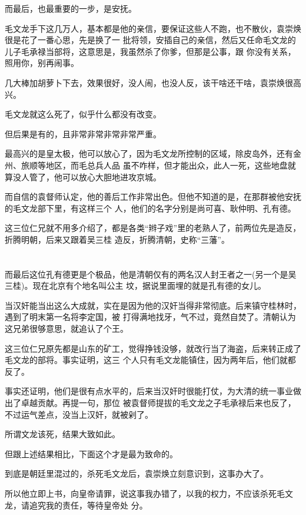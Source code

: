 \documentclass[11pt,a4paper,onecolumn]{article}
\begin{document}
而最后，也最重要的一步，是安抚。

毛文龙手下这几万人，基本都是他的亲信，要保证这些人不跑，也不散伙，袁崇焕很是花了一番心思，先是换了一
批将领，安插自己的亲信，然后又任命毛文龙的儿子毛承禄当部将，这意思是，我虽然杀了你爹，但那是公事，跟
你没有关系，照用你，别再闹事。

几大棒加胡萝卜下去，效果很好，没人闹，也没人反，该干啥还干啥，袁崇焕很高兴。

毛文龙就这么死了，似乎什么都没有改变。

但后果是有的，且非常非常非常非常严重。

最高兴的是皇太极，他可以放心了，因为毛文龙所控制的区域，除皮岛外，还有金州、旅顺等地区，而毛总兵人品
虽不咋样，但才能出众，此人一死，这些地盘就算没人管了，他可以放心大胆地进攻京城。

而自信的袁督师认定，他的善后工作非常出色。但他不知道的是，在那群被他安抚的毛文龙部下里，有这样三个
人，他们的名字分别是尚可喜、耿仲明、孔有德。

这三位仁兄就不用多介绍了，都是各类``辫子戏''里的老熟人了，前两位先是造反，折腾明朝，后来又跟着吴三桂
造反，折腾清朝，史称``三藩''。

\section[\thesection]{}

而最后这位孔有德更是个极品，他是清朝仅有的两名汉人封王者之一(另一个是吴三桂)。现在北京有个地名叫公主
坟，据说里面埋的就是孔有德的女儿。

当汉奸能当出这么大成就，实在是因为他的汉奸当得非常彻底。后来镇守桂林时，遇到了明末第一名将李定国，被
打得满地找牙，气不过，竟然自焚了。清朝认为这兄弟很够意思，就追认了个王。

这三位仁兄原先都是山东的矿工，觉得挣钱没够，就改行当了海盗，后来转正成了毛文龙的部将。事实证明，这三
个人只有毛文龙能镇住，因为两年后，他们就都反了。

事实还证明，他们是很有点水平的，后来当汉奸时很能打仗，为大清的统一事业做出了卓越贡献。再提一句，那位
被袁督师提拔的毛文龙之子毛承禄后来也反了，不过运气差点，没当上汉奸，就被剁了。

所谓文龙该死，结果大致如此。

但跟上述结果相比，下面这个才是最为致命的。

到底是朝廷里混过的，杀死毛文龙后，袁崇焕立刻意识到，这事办大了。

所以他立即上书，向皇帝请罪，说这事我办错了，以我的权力，不应该杀死毛文龙，请追究我的责任，等待皇帝处
分。
\end{document}
